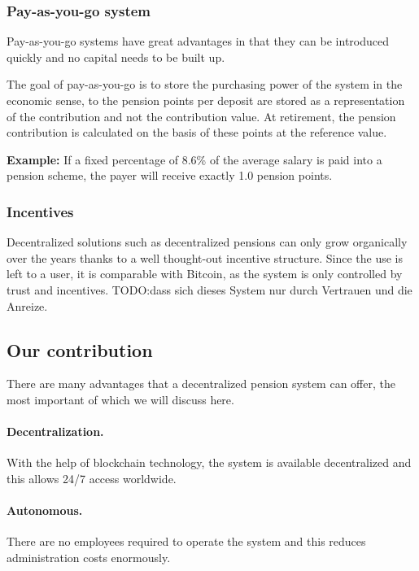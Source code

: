 \subsubsection{Pay-as-you-go system}


Pay-as-you-go systems have great advantages in that they can be introduced quickly and no capital needs to be built up.

The goal of pay-as-you-go is to store the purchasing power of the system in the economic sense, to the pension points per deposit are stored as a representation of the contribution and not the contribution value.
At retirement, the pension contribution is calculated on the basis of these points at the reference value.

\textbf{Example:} If a fixed percentage of 8.6\% of the average salary is paid into a pension scheme, the payer will receive exactly 1.0 pension points.


\subsubsection{Incentives}


Decentralized solutions such as decentralized pensions can only grow organically over the years thanks to a well thought-out incentive structure. Since the use is left to a user, it is comparable with Bitcoin\cite{nakamoto2012bitcoin}, as the system is only controlled by trust and incentives.
TODO:dass sich dieses System nur durch Vertrauen und die Anreize.


\subsection{Our contribution}
There are many advantages that a decentralized pension system can offer, the most important of which we will discuss here.

\paragraph{Decentralization.} With the help of blockchain technology, the system is available decentralized and this allows 24/7 access worldwide.

\paragraph{Autonomous.} There are no employees required to operate the system and this reduces administration costs enormously.

